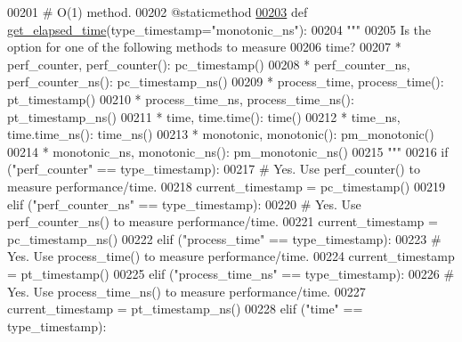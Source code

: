 \begin{DoxyCode}
00201     \textcolor{comment}{#   O(1) method.}
00202     @staticmethod
\hypertarget{performance__measurement_8py_source_l00203}{}\hyperlink{classutilities_1_1timing__measurements_1_1performance__measurement_1_1execution__time__measurement_a02b1d7ffce2b4c702a82a03803322e65}{00203}     \textcolor{keyword}{def }\hyperlink{classutilities_1_1timing__measurements_1_1performance__measurement_1_1execution__time__measurement_a02b1d7ffce2b4c702a82a03803322e65}{get\_elapsed\_time}(type\_timestamp="monotonic\_ns"):
00204         \textcolor{stringliteral}{"""}
00205 \textcolor{stringliteral}{            Is the option for one of the following methods to measure}
00206 \textcolor{stringliteral}{                time?}
00207 \textcolor{stringliteral}{                * perf\_counter, perf\_counter(): pc\_timestamp()}
00208 \textcolor{stringliteral}{                * perf\_counter\_ns, perf\_counter\_ns(): pc\_timestamp\_ns()}
00209 \textcolor{stringliteral}{                * process\_time, process\_time(): pt\_timestamp()}
00210 \textcolor{stringliteral}{                * process\_time\_ns, process\_time\_ns(): pt\_timestamp\_ns()}
00211 \textcolor{stringliteral}{                * time, time.time(): time()}
00212 \textcolor{stringliteral}{                * time\_ns, time.time\_ns(): time\_ns()}
00213 \textcolor{stringliteral}{                * monotonic, monotonic(): pm\_monotonic()}
00214 \textcolor{stringliteral}{                * monotonic\_ns, monotonic\_ns(): pm\_monotonic\_ns()}
00215 \textcolor{stringliteral}{        """}
00216         \textcolor{keywordflow}{if} (\textcolor{stringliteral}{"perf\_counter"} == type\_timestamp):
00217             \textcolor{comment}{# Yes. Use perf\_counter() to measure performance/time.}
00218             current\_timestamp = pc\_timestamp()
00219         \textcolor{keywordflow}{elif} (\textcolor{stringliteral}{"perf\_counter\_ns"} == type\_timestamp):
00220             \textcolor{comment}{# Yes. Use perf\_counter\_ns() to measure performance/time.}
00221             current\_timestamp = pc\_timestamp\_ns()
00222         \textcolor{keywordflow}{elif} (\textcolor{stringliteral}{"process\_time"} == type\_timestamp):
00223             \textcolor{comment}{# Yes. Use process\_time() to measure performance/time.}
00224             current\_timestamp = pt\_timestamp()
00225         \textcolor{keywordflow}{elif} (\textcolor{stringliteral}{"process\_time\_ns"} == type\_timestamp):
00226             \textcolor{comment}{# Yes. Use process\_time\_ns() to measure performance/time.}
00227             current\_timestamp = pt\_timestamp\_ns()
00228         \textcolor{keywordflow}{elif} (\textcolor{stringliteral}{"time"} == type\_timestamp):

\end{DoxyCode}
